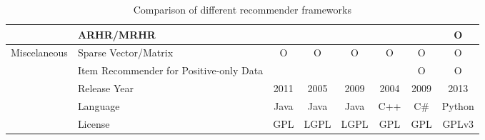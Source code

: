 \begin{table}[h]
{\begin{tabular}{c|l|cccccc}
                                         &ARHR/MRHR&&&&&&O\\ \midrule
    \multirow{6}{*}{Miscelaneous}        &Sparse Vector/Matrix&O&O&O&O&O&O\\
                                         &Item Recommender for Positive-only Data&&&&&O&O\\
                                         &Release Year&2011&2005&2009&2004&2009&2013\\
                                         &Language&Java&Java&Java&C++&C\#&Python\\
                                         &License&GPL&LGPL&LGPL&GPL&GPL&GPLv3\\ \bottomrule
\end{tabular}}
\label{comparisontable}
\caption{Comparison of different recommender frameworks}
\end{table}
